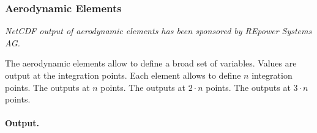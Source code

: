 \subsubsection{Aerodynamic Elements}
\label{sec:NetCDF:Elem:Aerodynamic}
\emph{NetCDF output of aerodynamic elements has been sponsored
by REpower Systems AG.}

The aerodynamic elements allow to define a broad set of variables.
Values are output at the integration points.
Each element allows to define $n$ integration points.
The  outputs at $n$ points.
The  outputs at $2 \cdot n$ points.
The  outputs at $3 \cdot n$ points.

\paragraph{Output.}
